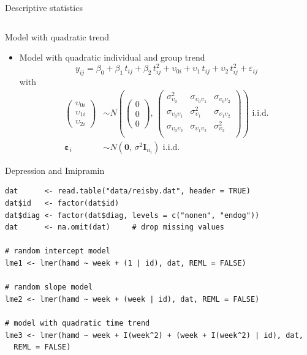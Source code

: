 \documentclass[aspectratio=169]{beamer}
\newcommand{\vect}[1]{\mathbf{#1}}
\newcommand{\mat}[1]{\mathbf{#1}}
\newcommand{\gvect}[1]{\boldsymbol{#1}}
\begin{document}
\begin{frame}{Descriptive statistics}
\begin{columns}
\begin{column}{.6\textwidth}
  \vspace{1cm}
\end{column}
\end{columns}
\end{frame}


\begin{frame}[fragile]{Model with quadratic trend}
  \begin{itemize}
    \item Model with quadratic individual and group trend
      \[
 y_{ij} = \beta_0 + \beta_1\,t_{ij} + \beta_2\,t^2_{ij} + \upsilon_{0i} +
      \upsilon_1\,t_{ij} + \upsilon_2\,t^2_{ij} + \varepsilon_{ij}
      \]
with
\begin{align*}
  \begin{pmatrix}
    \upsilon_{0i}\\
    \upsilon_{1i}\\
    \upsilon_{2i}
  \end{pmatrix} &\sim
  N \left(\begin{pmatrix}
      0\\ 0\\ 0
  \end{pmatrix}, \,
  \begin{pmatrix}
    \sigma^2_{\upsilon_0} & \sigma_{\upsilon_0 \upsilon_1} & \sigma_{\upsilon_0 \upsilon_2}\\
    \sigma_{\upsilon_0 \upsilon_1} & \sigma^2_{\upsilon_1} & \sigma_{\upsilon_1 \upsilon_2}\\
    \sigma_{\upsilon_0 \upsilon_2} & \sigma_{\upsilon_1 \upsilon_2} & \sigma^2_{\upsilon_2}\\
      \end{pmatrix} \right)
    \text{ i.i.d.} \\
  \gvect{\varepsilon}_i &\sim N(\vect{0}, \, \sigma^2 \mat{I}_{n_i})
    \text{ i.i.d.}
\end{align*}
  \end{itemize}
\vspace{-.5cm}
\end{frame}

\begin{frame}[fragile]{Depression and Imipramin}
  \begin{lstlisting}
dat      <- read.table("data/reisby.dat", header = TRUE)
dat$id   <- factor(dat$id)
dat$diag <- factor(dat$diag, levels = c("nonen", "endog"))
dat      <- na.omit(dat)     # drop missing values

# random intercept model
lme1 <- lmer(hamd ~ week + (1 | id), dat, REML = FALSE)

# random slope model
lme2 <- lmer(hamd ~ week + (week | id), dat, REML = FALSE)

# model with quadratic time trend
lme3 <- lmer(hamd ~ week + I(week^2) + (week + I(week^2) | id), dat,
  REML = FALSE)
  \end{lstlisting}
\end{frame}
\end{document}
